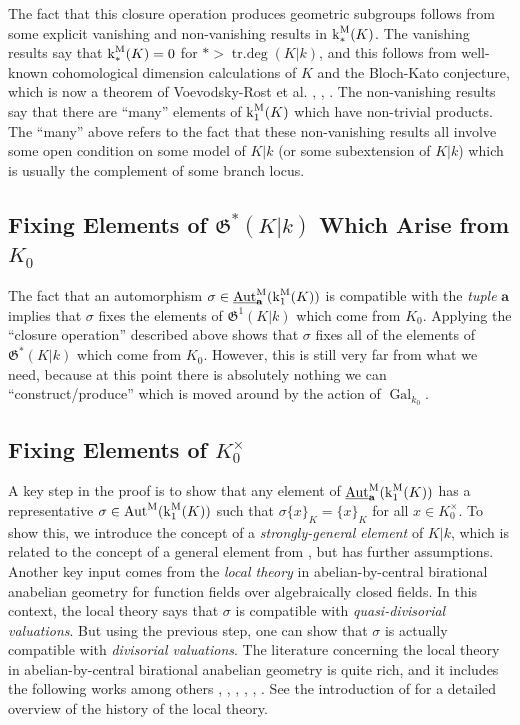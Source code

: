 \documentclass[11pt]{amsart}
\theoremstyle{definition}
\theoremstyle{remark}
\numberwithin{equation}{section}
\DeclareMathOperator{\Aut}{Aut}
\DeclareMathOperator{\Gal}{Gal}
\DeclareMathOperator{\trdeg}{tr.deg}
\newcommand{\abf}{\mathbf{a}}
\newcommand{\Gfrak}{\mathfrak{G}}
\newcommand{\Autm}{\Aut^{\rm M}}
\newcommand{\UAutm}{\underline{\Aut}^{\rm M}}
\renewcommand{\k}{\operatorname{k}^{\rm M}}
\newcommand{\Galk}{{\Gal_{k_0}}}
\begin{document}
The fact that this closure operation produces geometric subgroups follows from some explicit vanishing and non-vanishing results in $\k_*(K)$.
The vanishing results say that $\k_*(K) = 0$ for $* > \trdeg(K|k)$, and this follows from well-known cohomological dimension calculations of $K$ and the Bloch-Kato conjecture, which is now a theorem of {\sc Voevodsky-Rost} et al. \cite{Voevodsky:2011}, \cite{Rost:1998}, \cite{Weibel:2009}.
The non-vanishing results say that there are ``many'' elements of $\k_1(K)$ which have non-trivial products.
The ``many'' above refers to the fact that these non-vanishing results all involve some open condition on some model of $K|k$ (or some subextension of $K|k$) which is usually the complement of some branch locus.

\subsection{Fixing Elements of $\Gfrak^*(K|k)$ Which Arise from $K_0$}

The fact that an automorphism $\sigma\in\UAutm_\abf(\k_1(K))$ is compatible with the \emph{tuple} $\abf$ implies that $\sigma$ fixes the elements of $\Gfrak^1(K|k)$ which come from $K_0$.
Applying the ``closure operation'' described above shows that $\sigma$ fixes all of the elements of $\Gfrak^*(K|k)$ which come from $K_0$.
However, this is still very far from what we need, because at this point there is absolutely nothing we can ``construct/produce'' which is moved around by the action of $\Galk$.

\subsection{Fixing Elements of $K_0^\times$}

A key step in the proof is to show that any element of $\UAutm_\abf(\k_1(K))$ has a representative $\sigma \in \Autm(\k_1(K))$ such that $\sigma \{x\}_K = \{x\}_K$ for all $x \in K_0^\times$.
To show this, we introduce the concept of a \emph{strongly-general element} of $K|k$, which is related to the concept of a general element from \cite{Pop:2007}, \cite{Pop:2012} but has further assumptions.
Another key input comes from the \emph{local theory} in abelian-by-central birational anabelian geometry for function fields over algebraically closed fields.
In this context, the local theory says that $\sigma$ is compatible with \emph{quasi-divisorial valuations}.
But using the previous step, one can show that $\sigma$ is actually compatible with \emph{divisorial valuations}.
The literature concerning the local theory in abelian-by-central birational anabelian geometry is quite rich, and it includes the following works among others \cite{Bogomolov:2002}, \cite{Mahe:2004}, \cite{Pop:2010}, \cite{Pop:2010a}, \cite{Topaz:2013a}, \cite{Topaz:2015}.
See the introduction of \cite{Topaz:2013a} for a detailed overview of the history of the local theory.
\end{document}
